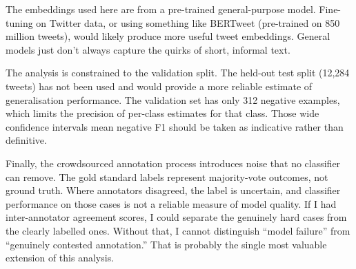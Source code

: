\documentclass[12pt]{article}
\begin{document}
The embeddings used here are from a pre-trained general-purpose model. Fine-tuning on Twitter data, or using something like BERTweet (pre-trained on 850 million tweets), would likely produce more useful tweet embeddings. General models just don't always capture the quirks of short, informal text.

The analysis is constrained to the validation split. The held-out test split (12,284 tweets) has not been used and would provide a more reliable estimate of generalisation performance. The validation set has only 312 negative examples, which limits the precision of per-class estimates for that class. Those wide confidence intervals mean negative F1 should be taken as indicative rather than definitive.

Finally, the crowdsourced annotation process introduces noise that no classifier can remove. The gold standard labels represent majority-vote outcomes, not ground truth. Where annotators disagreed, the label is uncertain, and classifier performance on those cases is not a reliable measure of model quality. If I had inter-annotator agreement scores, I could separate the genuinely hard cases from the clearly labelled ones. Without that, I cannot distinguish ``model failure'' from ``genuinely contested annotation.'' That is probably the single most valuable extension of this analysis.



\nocite{*}




\end{document}
